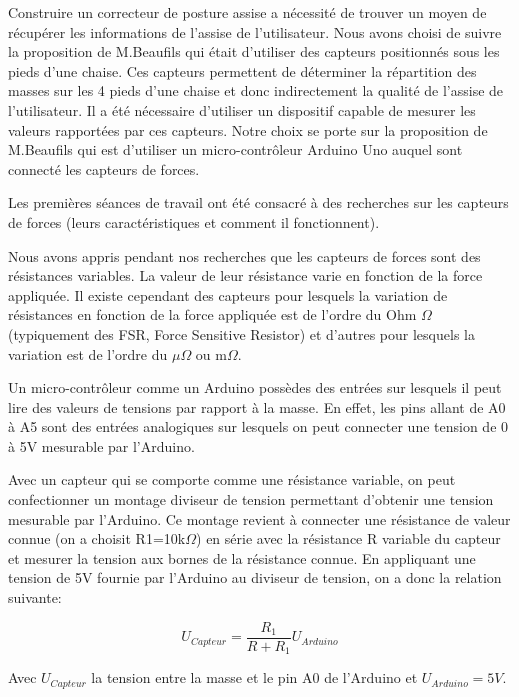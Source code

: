 \documentclass{polytech/polytech}
\begin{document}
Construire un correcteur de posture assise a nécessité de trouver un moyen de récupérer les informations de l'assise de l'utilisateur. Nous avons choisi de suivre la proposition de M.Beaufils qui était d'utiliser des capteurs positionnés sous les pieds d'une chaise. Ces capteurs permettent de déterminer la répartition des masses sur les 4 pieds d'une chaise et donc indirectement la qualité de l'assise de l'utilisateur. Il a été nécessaire d'utiliser un dispositif capable de mesurer les valeurs rapportées par ces capteurs. Notre choix se porte sur la proposition de M.Beaufils qui est d'utiliser un  micro-contrôleur Arduino Uno auquel sont connecté les capteurs de forces. 

Les premières séances de travail ont été consacré à des recherches sur les capteurs de forces (leurs caractéristiques et comment il fonctionnent). 

Nous avons appris pendant nos recherches que les capteurs de forces sont des résistances variables. La valeur de leur résistance varie en fonction de la force appliquée. Il existe cependant des capteurs pour lesquels la variation de résistances en fonction de la force appliquée est de l'ordre du Ohm $\Omega$ (typiquement des FSR, Force Sensitive Resistor) et d'autres pour lesquels la variation est de l'ordre du $\mu \Omega$ ou $\mathrm{m} \Omega$.

Un micro-contrôleur comme un Arduino possèdes des entrées sur lesquels il peut lire des valeurs de tensions par rapport à la masse. En effet, les pins allant de A0 à A5 sont des entrées analogiques sur lesquels on peut connecter une tension de 0 à 5V mesurable par l'Arduino. 

Avec un capteur qui se comporte comme une résistance variable, on peut confectionner un montage diviseur de tension permettant d'obtenir une tension mesurable par l'Arduino. Ce montage revient à connecter une résistance de valeur connue (on a choisit R1=10k$\Omega$) en série avec la résistance R variable du capteur et mesurer la tension aux bornes de la résistance connue.  En appliquant une tension de 5V fournie par l'Arduino au diviseur de tension, on a donc la relation suivante:

\begin{equation}
\label{eqn:fsr_resistor}
U_{Capteur}= \frac{R_1}{ R + R_1} U_{Arduino} 
\end{equation}
 
 Avec $U_{Capteur}$ la tension entre la masse et le pin A0 de l'Arduino et $U_{Arduino}=5V$.
 
\end{document}
